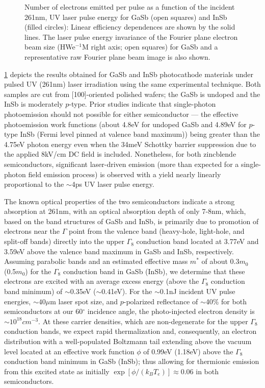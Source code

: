 \begin{figure}
  \centering
  
  \caption[Electron emission vs UV laser pulse energy for GaSb and InSb]{
    Number of electrons emitted per pulse as a function of the incident 261nm, UV laser pulse energy for GaSb (open squares) and InSb (filled circles): Linear efficiency dependences are shown by the solid lines.
    The laser pulse energy invariance of the Fourier plane electron beam size (HWe$^{-1}$M right axis; open squares) for GaSb and a representative raw Fourier plane beam image is also shown.
  }
  \label{fig:este-semicond}
\end{figure}

\ref{fig:este-semicond} depicts the results obtained for GaSb and InSb photocathode materials under pulsed UV (261nm) laser irradiation using the same experimental technique.
Both samples are cut from [100]-oriented polished wafers; the GaSb is undoped and the InSb is moderately $p$-type.
Prior studies\cite{gobeli_photoelectric_1965} indicate that single-photon photoemission should not possible for either semiconductor --- the effective photoemission work functions (about 4.8eV for undoped GaSb and 4.89eV for $p$-type InSb (Fermi level pinned at valence band maximum)) being greater than the 4.75eV photon energy even when the 34meV Schottky barrier suppression due to the applied 8kV/cm DC field is included\cite{dowell_quantum_2009}.
Nonetheless, for both zincblende semiconductors, significant laser-driven emission (more than expected for a single-photon field emission process) is observed with a yield nearly linearly proportional to the $\sim$4ps UV laser pulse energy.

The known optical properties of the two semiconductors\cite{aspnes_dielectric_1983} indicate a strong absorption at 261nm, with an optical absorption depth of only 7-8nm, which, based on the band structures of GaSb\cite{chelikowsky_nonlocal_1976} and InSb\cite{chelikowsky_erratum_1984}, is primarily due to promotion of electrons near the $\Gamma$ point from the valence band (heavy-hole, light-hole, and split-off bands) directly into the upper $\Gamma_8$ conduction band located at 3.77eV and 3.59eV above the valence band maximum in GaSb and InSb, respectively.
Assuming parabolic bands and an estimated effective mass $m^*$ of about 0.3$m_0$ (0.5$m_0$) for the $\Gamma_8$ conduction band in GaSb (InSb), we determine that these electrons are excited with an average excess energy (above the $\Gamma_8$ conduction band minimum) of $\sim$0.35eV ($\sim$0.41eV).
For the $\sim$0.1nJ incident UV pulse energies, $\sim40\mu$m laser spot size, and $p$-polarized reflectance of $\sim$40\% for both semiconductors at our 60$^{\circ}$ incidence angle, the photo-injected electron density is $\sim10^{18}cm^{-3}$.
At these carrier densities, which are non-degenerate for the upper $\Gamma_8$ conduction bands, we expect rapid thermalization\cite{portella_k-space_1992} and, consequently, an electron distribution with a well-populated Boltzmann tail extending above the vacuum level located at an effective work function $\phi$ of 0.99eV (1.18eV) above the $\Gamma_8$ conduction band minimum in GaSb (InSb); thus allowing for thermionic emission from this excited state as initially $\exp[\phi/(k_B T_e)] \approx 0.06$ in both semiconductors.  

